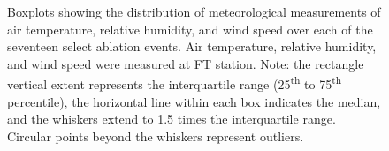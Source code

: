 \documentclass[
  letterpaper,
]{tex/uofsthesis-cs}
\begin{document}
\begin{figure}


\caption{\label{fig-event-met-boxplot}Boxplots showing the distribution
of meteorological measurements of air temperature, relative humidity,
and wind speed over each of the seventeen select ablation events. Air
temperature, relative humidity, and wind speed were measured at FT
station. Note: the rectangle vertical extent represents the
interquartile range (25\textsuperscript{th} to 75\textsuperscript{th}
percentile), the horizontal line within each box indicates the median,
and the whiskers extend to 1.5 times the interquartile range. Circular
points beyond the whiskers represent outliers.}

\end{figure}%
\end{document}
